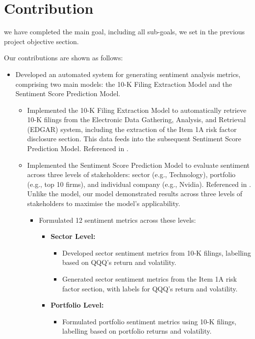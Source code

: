 \documentclass[logo,bsc,singlespacing,parskip]{infthesis}
\begin{document}
\section{Contribution}
\label{sec:contribution}
we have completed the main goal, including all sub-goals, we set in the previous project objective section. 

Our contributions are shown as follows:

\begin{itemize}
  \item Developed an automated system for generating sentiment analysis metrics, comprising two main models: the 10-K Filing Extraction Model and the Sentiment Score Prediction Model.
    \begin{itemize}
      \item Implemented the 10-K Filing Extraction Model to automatically retrieve 10-K filings from the Electronic Data Gathering, Analysis, and Retrieval (EDGAR) system, including the extraction of the Item 1A risk factor disclosure section. This data feeds into the subsequent Sentiment Score Prediction Model. Referenced in \cite{Sha2023}.
      \item Implemented the Sentiment Score Prediction Model to evaluate sentiment across three levels of stakeholders: sector (e.g., Technology), portfolio (e.g., top 10 firms), and individual company (e.g., Nvidia). Referenced in \cite{ke2020predicting}. Unlike the \cite{ke2020predicting} model, our model demonstrated results across three levels of stakeholders to maximise the model's applicability.
        \begin{itemize}
          \item Formulated 12 sentiment metrics across these levels:
            \begin{itemize}
              \item \textbf{Sector Level:}
                \begin{itemize}
                  \item Developed sector sentiment metrics from 10-K filings, labelling based on QQQ’s return and volatility.
                  \item Generated sector sentiment metrics from the Item 1A risk factor section, with labels for QQQ’s return and volatility.
                \end{itemize}
              \item \textbf{Portfolio Level:}
                \begin{itemize}
                  \item Formulated portfolio sentiment metrics using 10-K filings, labelling based on portfolio returns and volatility.

\end{itemize}
\end{itemize}
\end{itemize}
\end{itemize}
\end{itemize}
\end{document}
